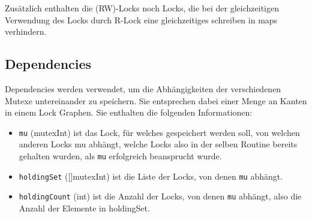 Zusätzlich enthalten die (RW)-Locks noch Locks, die bei der gleichzeitigen Verwendung 
des Locks durch R-Lock eine gleichzeitiges schreiben in maps verhindern.   
\subsection{Dependencies}
Dependencies werden verwendet, um die Abhängigkeiten der verschiedenen Mutexe 
untereinander zu speichern. Sie entsprechen dabei einer Menge an Kanten in einem 
Lock Graphen. Sie enthalten die folgenden Informationen:
\begin{itemize}
  \item \texttt{mu} (mutexInt) ist das Lock, für welches gespeichert werden soll, von 
   welchen anderen Locks mu abhängt, welche Locks also in der selben Routine 
   bereits gehalten wurden, als \texttt{mu} erfolgreich beansprucht wurde.
  \item \texttt{holdingSet} ([]mutexInt) ist die Liste der Locks, von denen \texttt{mu} abhängt.
  \item \texttt{holdingCount} (int) ist die Anzahl der Locks, von denen \texttt{mu} abhängt,
   also die Anzahl der Elemente in holdingSet.
\end{itemize}
